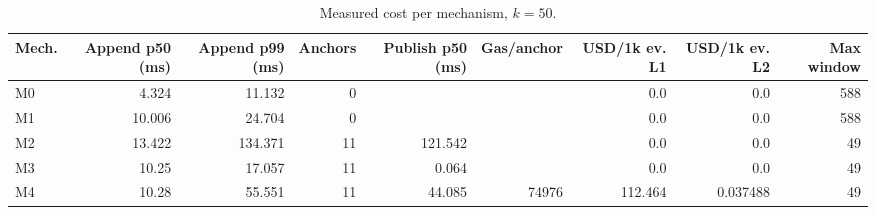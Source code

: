\begin{table}[t]
\caption{Measured cost per mechanism, $k=50$.}
\label{tab:cost}
\centering
\begin{tabular}{lrrrrrrrr}
\hline
Mech. & Append p50 (ms) & Append p99 (ms) & Anchors & Publish p50 (ms) & Gas/anchor & USD/1k ev. L1 & USD/1k ev. L2 & Max window \\
\hline
M0 & 4.324 & 11.132 & 0 &  &  & 0.0 & 0.0 & 588 \\
M1 & 10.006 & 24.704 & 0 &  &  & 0.0 & 0.0 & 588 \\
M2 & 13.422 & 134.371 & 11 & 121.542 &  & 0.0 & 0.0 & 49 \\
M3 & 10.25 & 17.057 & 11 & 0.064 &  & 0.0 & 0.0 & 49 \\
M4 & 10.28 & 55.551 & 11 & 44.085 & 74976 & 112.464 & 0.037488 & 49 \\
\hline
\end{tabular}
\end{table}